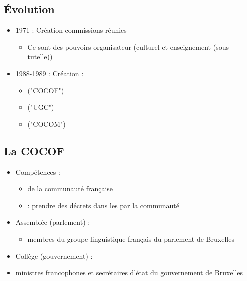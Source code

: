 \subsection{Évolution}
\begin{itemize}
	\item 1971 : Création commissions réunies
	\begin{itemize}
		\item Ce sont des pouvoirs organisateur (culturel et enseignement (sous tutelle))
	\end{itemize}
	\item 1988-1989 : Création :
	\begin{itemize}
		\item {} ("COCOF")
		\item {} ("UGC")
		\item {} ("COCOM")
	\end{itemize}
\end{itemize}

\subsection{La COCOF}
\begin{itemize}
	\item Compétences :
	\begin{itemize}
		\item {} de la communauté française
		\item {} : prendre des décrets dans les  par la communauté
   	\end{itemize}
   	\item Assemblée (parlement) :
   	\begin{itemize}
   		\item {} membres du groupe linguistique français du parlement de Bruxelles
   	\end{itemize}
   	\item Collège (gouvernement) :
   	\item {} ministres francophones et secrétaires d'état du gouvernement de Bruxelles
\end{itemize}

